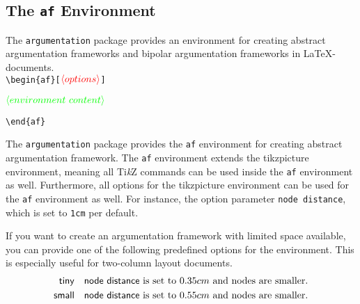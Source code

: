 \documentclass{article}
\newcommand{\tikzname}{Ti\emph{k}Z\xspace}
\newcommand{\argumentation}{\texttt{argumentation}\xspace}
\newcommand{\opt}[2][red]{\ensuremath{\textcolor{#1}{\langle #2\rangle}}}
\newtheorem{example}{Example}
\begin{document}
\subsection{The \texttt{af} Environment}
The \argumentation package provides an environment for creating abstract argumentation frameworks and bipolar argumentation frameworks in \LaTeX-documents.\\

\noindent
\verb|\begin{af}[|\opt{options}\verb|]|

\opt[green]{environment~content}

\noindent
\verb|\end{af}|

\begin{list}{}{\leftmargin=\parindent\rightmargin=0pt}
    \item
    The \argumentation package provides the \texttt{af} environment for creating abstract argumentation framework.
    The \texttt{af} environment extends the \textsf{tikzpicture} environment, meaning all \tikzname commands can be used inside the \texttt{af} environment as well.
    Furthermore, all options for the \textsf{tikzpicture} environment can be used for the \texttt{af} environment as well.
    For instance, the option parameter \verb|node distance|, which is set to \verb|1cm| per default.

    If you want to create an argumentation framework with limited space available, you can provide one of the following predefined options for the environment. This is especially useful for two-column layout documents.
    \begin{align*}
        \mathsf{tiny} &\quad \text{\textsf{node distance} is set to $0.35cm$ and nodes are smaller.}\\
        \mathsf{small} &\quad \text{\textsf{node distance} is set to $0.55cm$ and nodes are smaller.}
    \end{align*}

\end{list}
\end{document}
